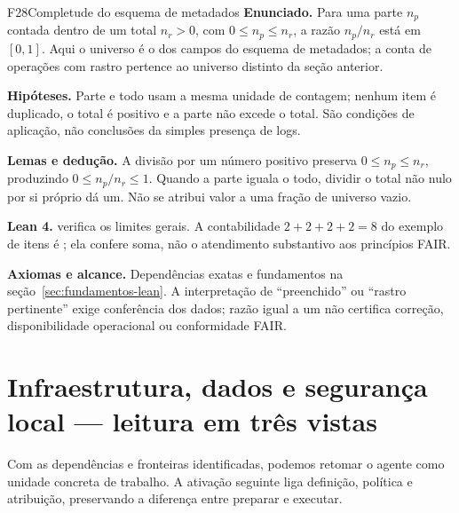 \begin{formalizacao}{F28}{Completude do esquema de metadados}
\textbf{Enunciado.} Para uma parte $n_p$ contada dentro de um total
$n_r>0$, com $0\leq n_p\leq n_r$, a razão $n_p/n_r$ está em $[0,1]$.
Aqui o universo é o dos campos do esquema de metadados; a conta de
operações com rastro pertence ao universo distinto da seção anterior.

\textbf{Hipóteses.} Parte e todo usam a mesma unidade de contagem;
nenhum item é duplicado, o total é positivo e a parte não excede o total.
São condições de aplicação, não conclusões da simples presença de logs.

\textbf{Lemas e dedução.} A divisão por um número positivo preserva
$0\leq n_p\leq n_r$, produzindo $0\leq n_p/n_r\leq1$. Quando a parte
iguala o todo, dividir o total não nulo por si próprio dá um. Não se
atribui valor a uma fração de universo vazio.

\textbf{Lean 4.} 
verifica os limites gerais. A contabilidade $2+2+2+2=8$ do exemplo de
itens é ; ela confere soma,
não o atendimento substantivo aos princípios FAIR.

\textbf{Axiomas e alcance.} Dependências exatas e fundamentos na
seção~\ref{sec:fundamentos-lean}. A interpretação de ``preenchido'' ou
``rastro pertinente'' exige conferência dos dados; razão igual a um não
certifica correção, disponibilidade operacional ou conformidade FAIR.
\end{formalizacao}


\clearpage\section{Infraestrutura, dados e segurança local — leitura em três vistas}\label{arch:AR16}





Com as dependências e fronteiras identificadas, podemos retomar o agente como unidade concreta de trabalho. A ativação seguinte liga definição, política e atribuição, preservando a diferença entre preparar e executar.
